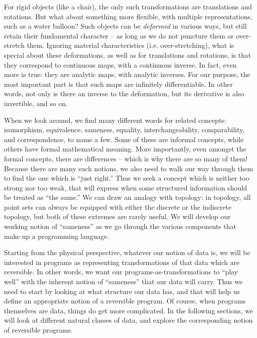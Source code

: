 \documentclass{article}
\begin{document}
For rigid objects (like a chair), the only such transformations are
translations and rotations. But what about something more flexible,
with multiple representations, such as a water balloon?  Such objects
can be \emph{deformed} in various ways, but still retain their
fundamental character -- as long as we do not puncture them or
over-stretch them. Ignoring material characteristics
(i.e. over-stretching), what is special about these deformations, as
well as for translations and rotations, is that they correspond to
continuous maps, with a continuous inverse. In fact, even more is
true: they are analytic maps, with analytic inverses. For our purpose,
the most important part is that such maps are infinitely
differentiable.  In other words, not only is there an inverse to the
deformation, but its derivative is also invertible, and so on.

When we look around, we find many different words for related
concepts: isomorphism, equivalence, sameness, equality,
interchangeability, comparability, and correspondence, to name a
few. Some of these are informal concepts, while others have formal
mathematical meaning.  More importantly, even amongst the formal
concepts, there are differences -- which is why there are so many of
them! Because there are many such notions, we also need to walk our
way through them to find the one which is ``just right.'' Thus we seek
a concept which is neither too strong nor too weak, that will express
when some structured information should be treated as ``the same.''
We can draw an analogy with topology: in topology, all point sets can
always be equipped with either the discrete or the indiscrete
topology, but both of these extremes are rarely useful. We will
develop our working notion of ``sameness'' as we go through the
various components that make up a programming language.

Starting from the physical perspective, whatever our notion of data
is, we will be interested in programs as representing transformations
of that data which are reversible. In other words, we want our
programs-as-transformations to ``play well'' with the inherent notion
of ``sameness'' that our data will carry. Thus we need to start by
looking at what structure our data has, and that will help us define
an appropriate notion of a reversible program. Of course, when
programs themselves are data, things do get more complicated.  In the
following sections, we will look at different natural classes of data,
and explore the corresponding notion of reversible programs.
\end{document}
